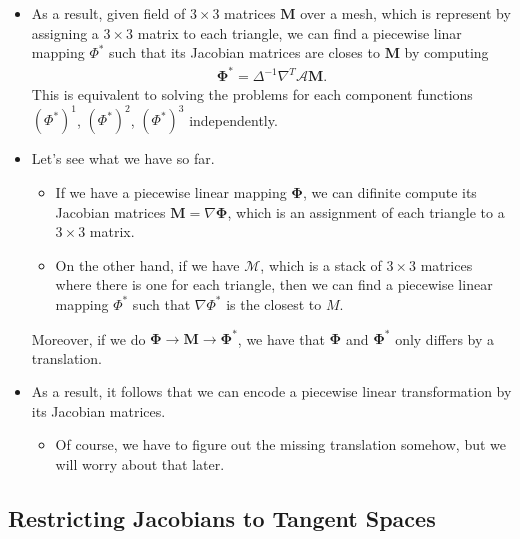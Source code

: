 \documentclass[10pt]{article}
\newcommand{\ve}[1]{\mathbf{#1}}
\newcommand{\ves}[1]{\boldsymbol{#1}}
\newcommand{\ra}{\rightarrow}
\newcommand{\mcal}[1]{\mathcal{#1}}
\begin{document}
\begin{itemize}
    \item As a result, given field of $3 \times 3$ matrices $\ve{M}$ over a mesh, which is represent by assigning a $3 \times 3$ matrix to each triangle, we can find a piecewise linar mapping $\Phi^*$ such that its Jacobian matrices are closes to $\ve{M}$ by computing
    \begin{align*}
        \ves{\Phi}^* = \Delta^{-1} \nabla^T \mcal{A} \ve{M}.
    \end{align*}
    This is equivalent to solving the problems for each component functions $(\Phi^*)^1$, $(\Phi^*)^2$, $(\Phi^*)^3$ independently.

    \item Let's see what we have so far.
    \begin{itemize}
        \item If we have a piecewise linear mapping $\ves{\Phi}$, we can difinite compute its Jacobian matrices $\ve{M} = \nabla \ves{\Phi}$, which is an assignment of each triangle to a $3 \times 3$ matrix.
        \item On the other hand, if we have $\mcal{M}$, which is a stack of $3 \times 3$ matrices where there is one for each triangle, then we can find a piecewise linear mapping $\Phi^*$ such that $\nabla \Phi^*$ is the closest to $M$.
    \end{itemize}
    Moreover, if we do $\ves{\Phi} \ra \ve{M} \ra \ves{\Phi}^*$, we have that $\ves{\Phi}$ and $\ves{\Phi}^*$ only differs by a translation.

    \item As a result, it follows that we can encode a piecewise linear transformation by its Jacobian matrices.
    \begin{itemize}
        \item Of course, we have to figure out the missing translation somehow, but we will worry about that later.
    \end{itemize}
\end{itemize}

\subsection{Restricting Jacobians to Tangent Spaces}
\end{document}
